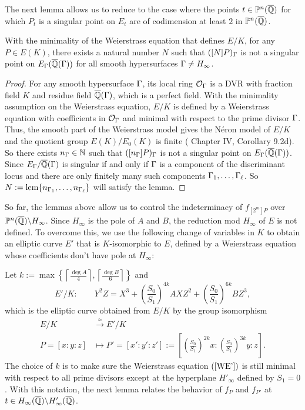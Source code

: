 \documentclass[12pt,reqno]{amsart}
\begin{document}
The next lemma allows us to reduce to the case where the points $t \in \mathbb{P}^n(\overline{\mathbb{Q}})$ for which $P_t$ is a singular point on $E_t$ are of codimension at least $2$ in $\mathbb{P}^n(\overline{\mathbb{Q}})$.

\begin{lemma} \label{LNS} With the minimality of the Weierstrass equation that defines $E/K$, for any $P \in E(K)$, there exists a natural number $N$ such that $([N]P)_\Gamma$ is not a singular point on $E_\Gamma(\overline{\mathbb{Q}}(\Gamma))$ for all smooth hypersurfaces $\Gamma \neq H_\infty$. 
\end{lemma}

\begin{proof} For any smooth hypersurface $\Gamma$, its local ring ${\mathcal O}_\Gamma$ is a DVR with fraction field $K$ and residue field $\overline{\mathbb{Q}}(\Gamma)$, which is a perfect field.  With the minimality assumption on the Weierstrass equation, $E/K$ is defined by a Weierstrass equation with coefficients in ${\mathcal O}_\Gamma$ and minimal with respect to the prime divisor $\Gamma$. Thus, the smooth part of the Weierstrass model gives the N\'eron model of $E/K$ and the quotient group $E(K)/E_0(K)$ is finite (\cite{SAT} Chapter IV, Corollary 9.2d). So there exists $n_\Gamma \in \mathbb{N}$ such that $([n_\Gamma]P)_\Gamma$ is not a singular point on $E_\Gamma(\overline{\mathbb{Q}}(\Gamma))$. Since $E_\Gamma/\overline{\mathbb{Q}}(\Gamma)$ is singular if and only if $\Gamma$ is a component of the discriminant locus and there are only finitely many such components $\Gamma_1, \ldots, \Gamma_\ell$. So $N:=\operatorname{lcm}\{n_{\Gamma_1}, \dots, n_{\Gamma_\ell}\}$ will satisfy the lemma.
\end{proof}

So far, the lemmas above allow us to control the indeterminacy of $f_{[2^m]P}$ over $\mathbb{P}^n(\overline{\mathbb{Q}})\backslash H_\infty$. Since $H_\infty$ is the pole of $A$ and $B$, the reduction mod $H_\infty$ of $E$ is not defined. To overcome this, we use the following change of variables in $K$ to obtain an elliptic curve $E'$ that is $K$-isomorphic to $E$, defined by a Weierstrass equation whose coefficients don't have pole at $H_\infty$:

Let $k:=\max\left\{ \left\lceil \frac{\deg A}{4}\right\rceil, \left\lceil \frac{\deg B}{6}\right\rceil \right\}$ and 
\begin{equation}\label{WE'} E'/K: \qquad  Y^2Z=X^3+\left(\frac{S_0}{S_1}\right)^{4k}AXZ^2+\left(\frac{S_0}{S_1}\right)^{6k}BZ^3,
\end{equation}
which is the elliptic curve obtained from $E/K$ by the group isomorphism 
\begin{align*} E/K &\stackrel{\approx}{\longrightarrow} E'/K \\
P=[x:y:z] &\longmapsto P'=[x':y':z']:=\left[\left(\frac{S_0}{S_1}\right)^{2k}x: \left(\frac{S_0}{S_1}\right)^{3k}y:z \right].
\end{align*} The choice of $k$ is to make sure the Weierstrass equation $(\ref{WE'})$ is still minimal with respect to all prime divisors except at the hyperplane $H'_\infty$ defined by $S_1=0$. With this notation, the next lemma relates the behavior of $f_P$ and $f_{P'}$ at $t \in H_\infty(\overline{\mathbb{Q}})\backslash H'_\infty(\overline{\mathbb{Q}})$.
\end{document}
